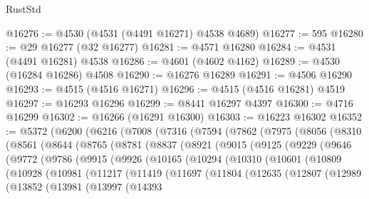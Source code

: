 \begin{lexlean}{RustStd}
\begin{coremodule}
{\begin{coremodule}
{{{{{{{{{{{{{{{{{{{{{{{{{{{{{{{{{{{{{{{{{{{{{{{{{{{{{{{@16276 := @4530 (@4531 (@4491 @16271) @4538 @4689)
@16277 := 595
@16280 := @29 @16277 (@32 @16277)
@16281 := @4571 @16280
@16284 := @4531 (@4491 @16281) @4538
@16286 := @4601 (@4602 @4162)
@16289 := @4530 (@16284 @16286) @4508
@16290 := @16276 @16289
@16291 := @4506 @16290
@16293 := @4515 (@4516 @16271)
@16296 := @4515 (@4516 @16281) @4519
@16297 := @16293 @16296
@16299 := @8441 @16297 @4397
@16300 := @4716 @16299
@16302 := @16266 (@16291 @16300)
@16303 := @16223 @16302
@16352 := @5372
    (@6200
      (@6216
        (@7008
          (@7316
            (@7594
              (@7862
                (@7975
                  (@8056
                    (@8310
                      (@8561
                        (@8644
                          (@8765
                            (@8781
                              (@8837
                                (@8921
                                  (@9015
                                    (@9125
                                      (@9229
                                        (@9646
                                          (@9772
                                            (@9786
                                              (@9915
                                                (@9926
                                                  (@10165
                                                    (@10294
                                                      (@10310
                                                        (@10601
                                                          (@10809
                                                            (@10928
                                                              (@10981
                                                                (@11217
                                                                  (@11419
                                                                    (@11697
                                                                      (@11804
                                                                        (@12635
                                                                          (@12807
                                                                            (@12989
                                                                              (@13852
                                                                                (@13981
                                                                                  (@13997
                                                                                    (@14393
}}}}}}}}}}}}}}}}}}}}}}}}}}}}}}}}}}}}}}}}}}}}}}}}}}}}}}}
\end{coremodule}}
\end{coremodule}
\end{lexlean}
